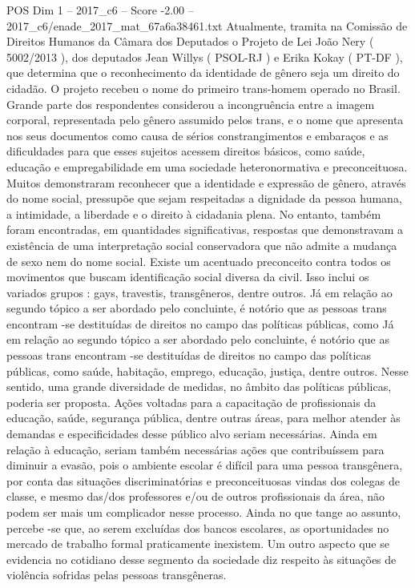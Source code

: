 \begin{textsample}{POS Dim 1 – 2017\_c6 – Score -2.00 – 2017\_c6/enade\_2017\_mat\_67a6a38461.txt}
Atualmente, tramita na Comissão de Direitos Humanos da Câmara dos Deputados o Projeto de Lei João Nery ( 5002/2013 ), dos deputados Jean Willys ( PSOL-RJ ) e Erika Kokay ( PT-DF ), que determina que o reconhecimento da identidade de gênero seja um direito do cidadão.
O projeto recebeu o nome do primeiro trans-homem operado no Brasil.
Grande parte dos respondentes considerou a incongruência entre a imagem corporal, representada pelo gênero assumido pelos trans, e o nome que apresenta nos seus documentos como causa de sérios constrangimentos e embaraços e as dificuldades para que esses sujeitos acessem direitos básicos, como saúde, educação e empregabilidade em uma sociedade heteronormativa e preconceituosa.
Muitos demonstraram reconhecer que a identidade e expressão de gênero, através do nome social, pressupõe que sejam respeitadas a dignidade da pessoa humana, a intimidade, a liberdade e o direito à cidadania plena.
No entanto, também foram encontradas, em quantidades significativas, respostas que demonstravam a existência de uma interpretação social conservadora que não admite a mudança de sexo nem do nome social.
Existe um acentuado preconceito contra todos os movimentos que buscam identificação social diversa da civil.
Isso inclui os variados grupos : gays, travestis, transgêneros, dentre outros.
Já em relação ao segundo tópico a ser abordado pelo concluinte, é notório que as pessoas trans encontram -se destituídas de direitos no campo das políticas públicas, como Já em relação ao segundo tópico a ser abordado pelo concluinte, é notório que as pessoas trans encontram -se destituídas de direitos no campo das políticas públicas, como saúde, habitação, emprego, educação, justiça, dentre outros.
Nesse sentido, uma grande diversidade de medidas, no âmbito das políticas públicas, poderia ser proposta.
Ações voltadas para a capacitação de profissionais da educação, saúde, segurança pública, dentre outras áreas, para melhor atender às demandas e especificidades desse público alvo seriam necessárias.
Ainda em relação à educação, seriam também necessárias ações que contribuíssem para diminuir a evasão, pois o ambiente escolar é difícil para uma pessoa transgênera, por conta das situações discriminatórias e preconceituosas vindas dos colegas de classe, e mesmo das/dos professores e/ou de outros profissionais da área, não podem ser mais um complicador nesse processo.
Ainda no que tange ao assunto, percebe -se que, ao serem excluídas dos bancos escolares, as oportunidades no mercado de trabalho formal praticamente inexistem.
Um outro aspecto que se evidencia no cotidiano desse segmento da sociedade diz respeito às situações de violência sofridas pelas pessoas transgêneras.

\end{textsample}
